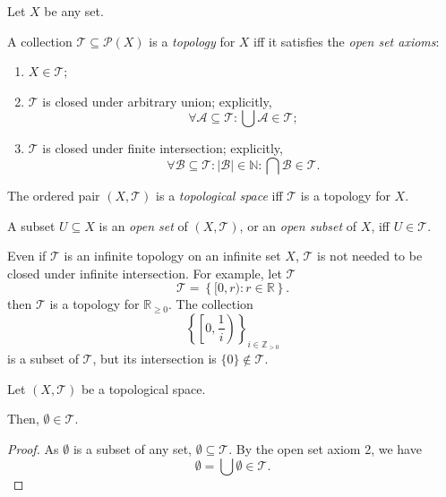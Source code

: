 \documentclass{report}
\begin{document}
\begin{definition}
	\label{def: topology}
	
	Let $X$ be any set.
	
	A collection $\mathcal T \subseteq \mathcal P(X)$ is a \textit{topology} for $X$ iff it satisfies the \textit{open set axioms}:
	\begin{enumerate}[(O1):]
		\item
		$X \in \mathcal T$;
		
		\item
		$\mathcal T$ is closed under arbitrary union; explicitly,
		$$
		\forall \mathcal A \subseteq \mathcal T: \bigcup \mathcal A \in \mathcal T;
		$$
		
		\item
		$\mathcal T$ is closed under finite intersection; explicitly,
		$$
		\forall \mathcal B \subseteq \mathcal T : |\mathcal B| \in \mathbb N : \bigcap \mathcal B \in \mathcal T.
		$$
	\end{enumerate}
	
	The ordered pair $(X, \mathcal T)$ is a \textit{topological space} iff $\mathcal T$ is a topology for $X$.
		
	A subset $U \subseteq X$ is an \textit{open set} of $(X, \mathcal T)$, or an \textit{open subset} of $X$, iff $U \in \mathcal T$.
\end{definition}


\begin{note}
	Even if $\mathcal T$ is an infinite	topology on an infinite set $X$, $\mathcal T$ is not needed to be closed under infinite intersection. For example, let $\mathcal T$
	$$
	\mathcal T = \left\{ [0,r): r \in \mathbb R \right\}.
	$$
	then $\mathcal T$ is a topology for $\mathbb R_{\ge 0}$. The collection
	$$
	\left\{ \left[ 0, \frac{1}{i} \right) \right\}_{i \in \mathbb Z_{> 0}}
	$$
	is a subset of $\mathcal T$, but its intersection is $\{0\} \notin \mathcal T$.
\end{note}



\begin{lemma}
	\label{lm: emptyset is in topology}
	
	Let $(X, \mathcal T)$ be a topological space.
	
	Then, $\emptyset \in \mathcal T$.
\end{lemma}


\begin{proof}
	As $\emptyset$ is a subset of any set, $\emptyset \subseteq \mathcal T$. By the open set axiom 2, we have
	$$
	\emptyset = \bigcup \emptyset \in \mathcal T.
	$$
\end{proof}
\end{document}
